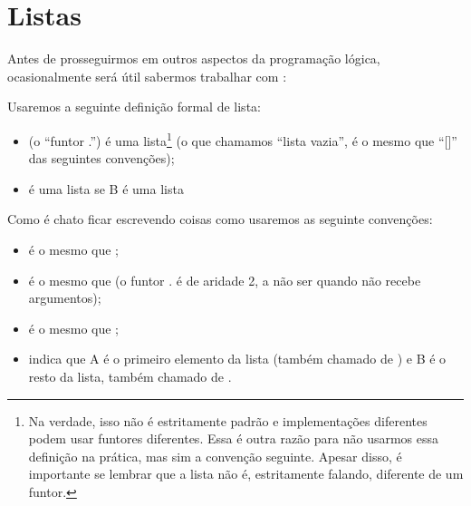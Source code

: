
%

\captionsetup[figure]{name=Árvore} \setlength{\belowcaptionskip}{1pt
  plus 1pt minus 1pt} \setlength{\abovecaptionskip}{1pt plus 1pt minus
  1pt}

\renewcommand\refname{Leituras Adicionais\\ \vspace{3mm} \normalsize{}
  \normalfont \\ A pesquisa e prática em programação lógica
  frequentemente é muito próxima à de linguagens funcionais e esse é o
  caso na área de transformações de programas. As transformações de
  \technical {folding/unfolding} foram primeiro adaptadas para a
  programação lógica por Tamaki e Sato \cite{tamaki}. Mais informações
  podem ser encontradas em \cite{ramakrishnan}. }


%
%
%


%

\section{Listas}

Antes de prosseguirmos em outros aspectos da programação lógica,
ocasionalmente será útil sabermos trabalhar com :

\begin{definition}
  Usaremos a seguinte definição formal de lista:
  \begin{itemize}
    \item {} (o ``funtor .'') é uma lista\footnote{Na
      verdade, isso não é estritamente padrão e implementações
      diferentes podem usar funtores diferentes. Essa é outra razão
      para não usarmos essa definição na prática, mas sim a convenção
      seguinte. Apesar disso, é importante se lembrar que a lista não
      é, estritamente falando, diferente de um funtor.} (o que
      chamamos ``lista vazia'', é o mesmo que ``[]'' das seguintes
      convenções);
    \item {} é uma lista se B é uma lista
  \end{itemize}
  Como é chato ficar escrevendo coisas como 
  usaremos as seguinte convenções:
  \begin{itemize}
    \item \codigo{[A,B]} é o mesmo que ;
    \item \codigo{[A]} é o mesmo que  (o funtor . é
      de aridade 2, a não ser quando não recebe argumentos);
    \item \codigo{[A, B, C, ...]} é o mesmo que ;
    \item \codigo{[A|B]} indica que A é o primeiro elemento da lista
      (também chamado de ) e B é o resto da
      lista, também chamado de  .
  \end{itemize}
\end{definition}


